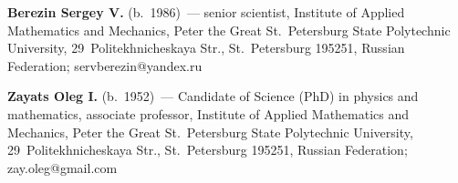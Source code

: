\noindent
\textbf{Berezin Sergey V.} (b.\ 1986)~---
senior scientist, Institute of Applied Mathematics and Mechanics, Peter the Great St.\ Petersburg State Polytechnic University,  29~Politekhnicheskaya Str., St.\ Petersburg 195251, Russian Federation; servberezin@yandex.ru

\vspace*{3pt}

\noindent
\textbf{Zayats Oleg I.} (b.\ 1952)~---
 Candidate of Science (PhD) in physics and mathematics, associate professor, Institute of Applied Mathematics and Mechanics, Peter the Great St.\ Petersburg  State Polytechnic University, 29~Politekhnicheskaya Str., St.\ Petersburg 195251, Russian Federation;  zay.oleg@gmail.com


    \label{end\stat}


    \renewcommand{\bibname}{\protect\rm Литература} 